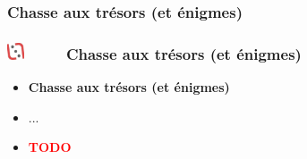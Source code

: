 \documentclass[slidetop,11pt]{beamer}
\def\moreInFrameTitleLeftt{\includegraphics[height=0.5cm]{img/ligueludique-0.png}~~~~~}
\begin{document}
\def\sectionPartIIbII{Chasse aux tr{\'e}sors (et {\'e}nigmes)}
\subsubsection{\sectionPartIIbII} %
\begin{frame}
	\frametitle{\moreInFrameTitleLeftt \sectionPartIIbII }
	\begin{itemize}
		\item \textbf{ \sectionPartIIbII }
		\item[] ...
		\item \textcolor{red}{ \textbf{TODO} }
	\end{itemize}
\end{frame} 

\def\sectionPartIIbIII{La curiosit{\'e} (et le reste) : deux groupes}
\end{document}
